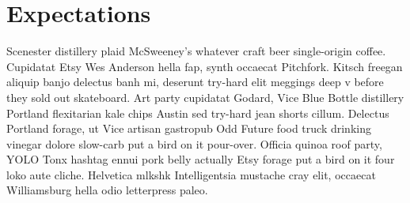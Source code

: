 \documentclass[a4paper,11pt,headings=small]{article}
\begin{document}
\section*{Expectations}
\quad Scenester distillery plaid McSweeney's whatever craft beer single-origin coffee. Cupidatat Etsy Wes Anderson hella fap, synth occaecat Pitchfork. Kitsch freegan aliquip banjo delectus banh mi, deserunt try-hard elit meggings deep v before they sold out skateboard. Art party cupidatat Godard, Vice Blue Bottle distillery Portland flexitarian kale chips Austin sed try-hard jean shorts cillum. Delectus Portland forage, ut Vice artisan gastropub Odd Future food truck drinking vinegar dolore slow-carb put a bird on it pour-over. Officia quinoa roof party, YOLO Tonx hashtag ennui pork belly actually Etsy forage put a bird on it four loko aute cliche. Helvetica mlkshk Intelligentsia mustache cray elit, occaecat Williamsburg hella odio letterpress paleo.




\end{document}
